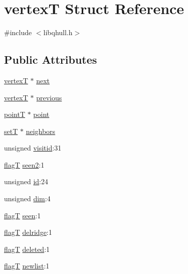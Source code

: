 \hypertarget{structvertexT}{}\section{vertex\+T Struct Reference}
\label{structvertexT}


{\ttfamily \#include $<$libqhull.\+h$>$}

\subsection*{Public Attributes}
\begin{DoxyCompactItemize}
\item 
\hyperlink{structvertexT}{vertex\+T} $\ast$ \hyperlink{structvertexT_a3a3a1920397852dd336f5141eac08cd0}{next}
\item 
\hyperlink{structvertexT}{vertex\+T} $\ast$ \hyperlink{structvertexT_a593ecf4a91a04457d270c28f8edeb70a}{previous}
\item 
\hyperlink{libqhull_8h_a255fb21ed55a989ae9e4913f15015a97}{point\+T} $\ast$ \hyperlink{structvertexT_a4c67fe901acd4ab6be93d09f803fcf6f}{point}
\item 
\hyperlink{structsetT}{set\+T} $\ast$ \hyperlink{structvertexT_ad491be4b8463d54fedb2ceba42fadd08}{neighbors}
\item 
unsigned \hyperlink{structvertexT_adde2f0618a40366ff4d1a420c334222f}{visitid}\+:31
\item 
\hyperlink{libqhull_8h_a0ff81862a2ab15dc96eb3803685cda2d}{flag\+T} \hyperlink{structvertexT_a99b3b203c7b51d9143e2261a87a674b8}{seen2}\+:1
\item 
unsigned \hyperlink{structvertexT_a06ea1b3346302aaf47f6ad95bfa98511}{id}\+:24
\item 
unsigned \hyperlink{structvertexT_a4f6f2bc224507c747313d356114e9b42}{dim}\+:4
\item 
\hyperlink{libqhull_8h_a0ff81862a2ab15dc96eb3803685cda2d}{flag\+T} \hyperlink{structvertexT_a6da8391894b9e9e3e56e7347bd47af88}{seen}\+:1
\item 
\hyperlink{libqhull_8h_a0ff81862a2ab15dc96eb3803685cda2d}{flag\+T} \hyperlink{structvertexT_a4e576aa2050db6ca1b8cbb77431daa7e}{delridge}\+:1
\item 
\hyperlink{libqhull_8h_a0ff81862a2ab15dc96eb3803685cda2d}{flag\+T} \hyperlink{structvertexT_aa6ead0ea4db6a5c2e73cff70ea1ec7af}{deleted}\+:1
\item 
\hyperlink{libqhull_8h_a0ff81862a2ab15dc96eb3803685cda2d}{flag\+T} \hyperlink{structvertexT_a6183d13d33e19cc8b8862899ac707b96}{newlist}\+:1
\end{DoxyCompactItemize}



